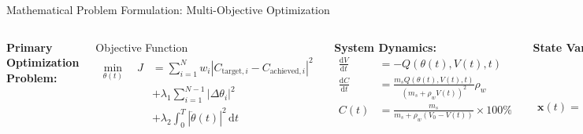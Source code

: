 \documentclass[aspectratio=169]{beamer}
\newcommand{\ddiff}[2]{\frac{\mathrm{d} #1}{\mathrm{d} #2}}
\newcommand{\integral}[4]{\int_{#1}^{#2} #3 \, \mathrm{d}#4}
\begin{document}
\begin{frame}{Mathematical Problem Formulation: Multi-Objective Optimization}
\begin{columns}[T]
\textbf{Primary Optimization Problem:}

\begin{exampleblock}{Objective Function}
\begin{align}
\min_{\theta(t)} \quad J &= \sum_{i=1}^{N} w_i |C_{\text{target},i} - C_{\text{achieved},i}|^2 \\
&+ \lambda_1 \sum_{i=1}^{N-1} |\Delta\theta_i|^2 \\
&+ \lambda_2 \integral{0}{T}{|\ddot{\theta}(t)|^2}{t}
\end{align}
\end{exampleblock}

\textbf{System Dynamics:}
\begin{align}
\ddiff{V}{t} &= -Q(\theta(t), V(t), t) \\
\ddiff{C}{t} &= \frac{m_s Q(\theta(t), V(t), t)}{(m_s + \rho_w V(t))^2} \rho_w \\
C(t) &= \frac{m_s}{m_s + \rho_w(V_0 - V(t))} \times 100\%
\end{align}

\textbf{State Variables:}
\begin{align}
\mathbf{x}(t) = \begin{bmatrix}
V(t) \\
h(t) \\
\theta(t) \\
\dot{\theta}(t) \\
Q(t) \\
C(t)
\end{bmatrix} \in \mathbb{R}^6
\end{align}

\textbf{Performance Indices:}
\begin{align}
J_{\text{accuracy}} &= \sqrt{\frac{1}{N}\sum_{i=1}^{N}(C_i - C_{\text{ref}})^2} \\
J_{\text{efficiency}} &= \frac{1}{N}\sum_{i=1}^{N} t_{\text{control},i}
\end{align}
\end{columns}
\end{frame}
\end{document}
